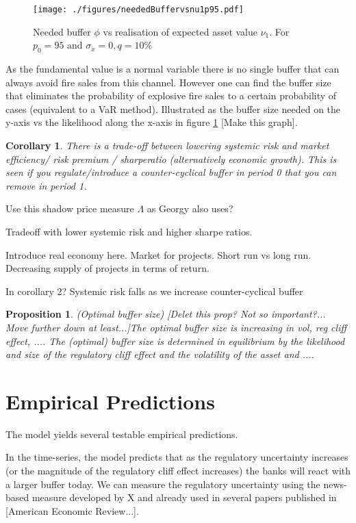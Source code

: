 \documentclass[11pt]{article}
\newtheorem{proposition}{Proposition}
\newtheorem{corollary}{Corollary}
\begin{document}
\begin{figure}[h]
\centering
\texttt{[image: ./figures/neededBuffervsnu1p95.pdf]}
\caption{Needed buffer $\phi$ vs realisation of expected asset value  $\nu_1$. For $p_0 = 95$ and $\sigma_x = 0, q = 10\%$}
\label{f_neededbufvfunShock}
\end{figure}

As the fundamental value is a normal variable there is no single buffer that can always avoid fire sales from this channel. However one can find the buffer size that eliminates the probability of explosive fire sales to a certain probability of cases (equivalent to a VaR method). Illustrated as the buffer size needed on the y-axis vs the likelihood along the x-axis in figure \ref{f_neededbufvfunShock} [Make this graph].

\begin{corollary}
There is a trade-off between lowering systemic risk and market efficiency/ risk premium / sharperatio (alternatively economic growth). This is seen if you regulate/introduce a counter-cyclical buffer in period 0 that you can remove in period 1.
\end{corollary}

Use this shadow price measure $\Lambda$ as Georgy also uses?

Tradeoff with lower systemic risk and higher sharpe ratios.

Introduce real economy here. Market for projects. Short run vs long run. Decreasing supply of projects in terms of return.

In corollary 2? Systemic risk falls as we increase counter-cyclical buffer

\begin{proposition} (Optimal buffer size)
[Delet this prop? Not so important?... Move further down at least...]The optimal buffer size is increasing in vol, reg cliff effect, ....
The (optimal) buffer size is determined in equilibrium by the likelihood and size of the regulatory cliff effect and the volatility of the asset and .... 
\end{proposition}



\section{Empirical Predictions}
The model yields several testable empirical predictions.

In the time-series, the model predicts that as the regulatory uncertainty increases (or the magnitude of the regulatory cliff effect increases) the banks will react with a larger buffer today.
We can measure the regulatory uncertainty using the news-based measure developed by X and already used in several papers published in [American Economic Review...].
\end{document}
